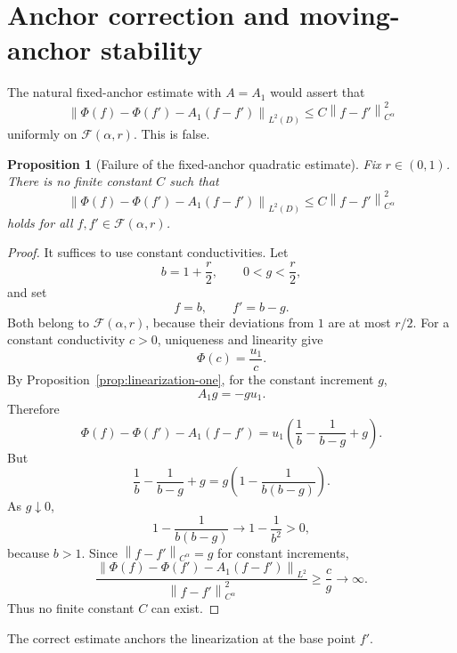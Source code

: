 \documentclass[12pt]{article}
\newtheorem{proposition}[theorem]{Proposition}
\theoremstyle{remark}
\newcommand{\norm}[1]{\left\lVert #1\right\rVert}
\begin{document}
\section{Anchor correction and moving-anchor stability}
\label{sec:anchor}

The natural fixed-anchor estimate with \(A=A_1\) would assert that
\[
\norm{\Phi(f)-\Phi(f')-A_1(f-f')}_{L^2(D)}
\le
C\norm{f-f'}_{C^\alpha}^2
\]
uniformly on \(\mathcal F(\alpha,r)\). This is false.

\begin{proposition}[Failure of the fixed-anchor quadratic estimate]
\label{prop:fixed-anchor-false}
Fix \(r\in(0,1)\). There is no finite constant \(C\) such that
\[
\norm{\Phi(f)-\Phi(f')-A_1(f-f')}_{L^2(D)}
\le
C\norm{f-f'}_{C^\alpha}^2
\]
holds for all \(f,f'\in\mathcal F(\alpha,r)\).
\end{proposition}
\begin{proof}
It suffices to use constant conductivities. Let
\[
b=1+\frac r2,
\qquad
0<g<\frac r2,
\]
and set
\[
f=b,
\qquad
f'=b-g.
\]
Both belong to \(\mathcal F(\alpha,r)\), because their deviations from \(1\) are at most \(r/2\). For a constant conductivity \(c>0\), uniqueness and linearity give
\[
\Phi(c)=\frac{u_1}{c}.
\]
By Proposition~\ref{prop:linearization-one}, for the constant increment \(g\),
\[
A_1 g=-g u_1.
\]
Therefore
\[
\Phi(f)-\Phi(f')-A_1(f-f')
=
u_1\left(
\frac1b-\frac1{b-g}+g
\right).
\]
But
\[
\frac1b-\frac1{b-g}+g
=
g\left(1-\frac1{b(b-g)}\right).
\]
As \(g\downarrow0\),
\[
1-\frac1{b(b-g)}
\longrightarrow
1-\frac1{b^2}>0,
\]
because \(b>1\). Since \(\norm{f-f'}_{C^\alpha}=g\) for constant increments,
\[
\frac{
\norm{\Phi(f)-\Phi(f')-A_1(f-f')}_{L^2}
}{
\norm{f-f'}_{C^\alpha}^2
}
\ge
\frac{c}{g}\to\infty.
\]
Thus no finite constant \(C\) can exist.
\end{proof}

The correct estimate anchors the linearization at the base point \(f'\).
\end{document}

